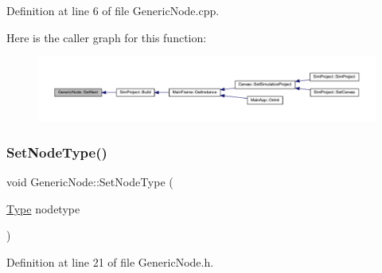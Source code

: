 Definition at line 6 of file Generic\+Node.\+cpp.

Here is the caller graph for this function\+:
\nopagebreak
\begin{figure}[H]
\begin{center}
\leavevmode
\includegraphics[width=350pt]{class_generic_node_ab627bbdbaaef832b9b79199bac113422_icgraph}
\end{center}
\end{figure}
\mbox{\label{class_generic_node_a793b15e284a17095c013015049628a03}} 
\subsubsection{\texorpdfstring{Set\+Node\+Type()}{SetNodeType()}}
{\footnotesize\ttfamily void Generic\+Node\+::\+Set\+Node\+Type (\begin{DoxyParamCaption}\item[{\hyperlink{class_generic_node_a9e7985ab9bbfa1c85091adc0ab71a6b6}{Type}}]{nodetype }\end{DoxyParamCaption})\hspace{0.3cm}{\ttfamily [inline]}}



Definition at line 21 of file Generic\+Node.\+h.

